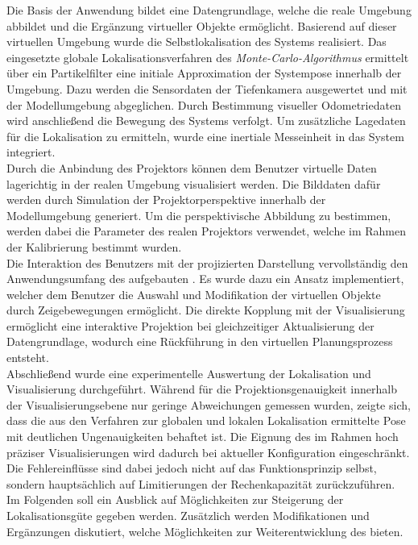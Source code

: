 Die Basis der Anwendung bildet eine Datengrundlage, welche die reale Umgebung abbildet und die Ergänzung virtueller Objekte ermöglicht. Basierend auf dieser virtuellen Umgebung wurde die Selbstlokalisation des Systems realisiert. Das eingesetzte globale Lokalisationsverfahren des \textit{Monte-Carlo-Algorithmus} ermittelt über ein Partikelfilter eine initiale Approximation der Systempose innerhalb der Umgebung. Dazu werden die Sensordaten der Tiefenkamera ausgewertet und mit der Modellumgebung abgeglichen. Durch Bestimmung visueller Odometriedaten wird anschließend die Bewegung des Systems verfolgt. Um zusätzliche Lagedaten für die Lokalisation zu ermitteln, wurde eine inertiale Messeinheit in das System integriert.\\

Durch die Anbindung des Projektors können dem Benutzer virtuelle Daten lagerichtig in der realen Umgebung visualisiert werden. Die Bilddaten dafür werden durch Simulation der Projektorperspektive innerhalb der Modellumgebung generiert. Um die perspektivische Abbildung zu bestimmen, werden dabei die Parameter des realen Projektors verwendet, welche im Rahmen der Kalibrierung bestimmt wurden.\\

Die Interaktion des Benutzers mit der projizierten Darstellung vervollständig den Anwendungsumfang des aufgebauten . Es wurde dazu ein Ansatz implementiert, welcher dem Benutzer die Auswahl und Modifikation der virtuellen Objekte durch Zeigebewegungen ermöglicht. Die direkte Kopplung mit der Visualisierung ermöglicht eine interaktive Projektion bei gleichzeitiger Aktualisierung der Datengrundlage, wodurch eine Rückführung in den virtuellen Planungsprozess entsteht.\\

Abschließend wurde eine experimentelle Auswertung der Lokalisation und Visualisierung durchgeführt. Während für die Projektionsgenauigkeit innerhalb der Visualisierungsebene nur geringe Abweichungen gemessen wurden, zeigte sich, dass die aus den Verfahren zur globalen und lokalen Lokalisation ermittelte Pose mit deutlichen Ungenauigkeiten behaftet ist. Die Eignung des  im Rahmen hoch präziser Visualisierungen wird dadurch bei aktueller Konfiguration eingeschränkt. Die Fehlereinflüsse sind dabei jedoch nicht auf das Funktionsprinzip selbst, sondern hauptsächlich auf Limitierungen der Rechenkapazität zurückzuführen.\\

Im Folgenden soll ein Ausblick auf Möglichkeiten zur Steigerung der Lokalisationsgüte gegeben werden. Zusätzlich werden Modifikationen und Ergänzungen diskutiert, welche Möglichkeiten zur Weiterentwicklung des  bieten.\\

